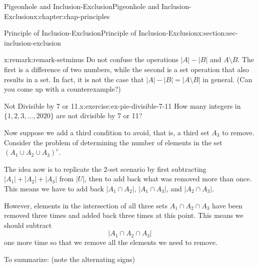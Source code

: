 \documentclass[oneside,10pt,]{book}
\numberwithin{equation}{section}
\begin{document}
\begin{chapterptx}{Pigeonhole and Inclusion-Exclusion}{}{Pigeonhole and Inclusion-Exclusion}{}{}{x:chapter:chap-principles}
\begin{sectionptx}{Principle of Inclusion-Exclusion}{}{Principle of Inclusion-Exclusion}{}{}{x:section:sec-inclusion-exclusion}
\begin{equation*}
\end{equation*}
%
\begin{remark}{}{x:remark:remark-setminus}%
Do not confuse the operations \(|A| - |B|\) and \(A \setminus B\). The first is a difference of two numbers, while the second is a set operation that also results in a set. In fact, it is not the case that \(|A| - |B| = |A \setminus B|\) in general. (Can you come up with a counterexample?)%
\end{remark}
\begin{inlineexercise}{Not Divisible by 7 or 11.}{x:exercise:ex-pie-divisible-7-11}%
How many integers in \(\{1,2,3,\ldots,2020\}\) are not divisible by 7 or 11?%
\end{inlineexercise}
Now suppose we add a third condition to avoid, that is, a third set \(A_3\) to remove. Consider the problem of determining the number of elements in the set \((A_1 \cup A_2 \cup A_3)^c\).%
\begin{sidebyside}{1}{0.325}{0.325}{0}%
\begin{sbspanel}{0.35}%
%
\end{sbspanel}%
\end{sidebyside}%
\par
The idea now is to replicate the 2-set scenario by first subtracting \(|A_1| + |A_2| + |A_3|\) from \(|U|\), then to add back what was removed more than once. This means we have to add back \(|A_1 \cap A_2|\), \(|A_1 \cap A_3|\), and \(|A_2 \cap A_3|\).%
\par
However, elements in the intersection of all three sets \(A_1 \cap A_2 \cap A_3\) have been removed three times and added back three times at this point. This means we should subtract%
\begin{equation*}
|A_1 \cap A_2 \cap A_3|
\end{equation*}
one more time so that we remove all the elements we need to remove.%
\par
To summarize: (note the alternating signs)%

\end{sectionptx}
\end{chapterptx}
\end{document}
